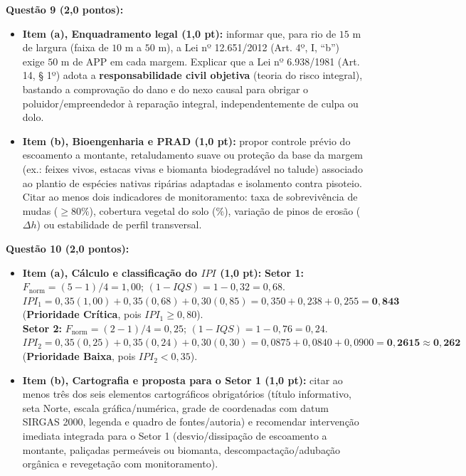 \begin{boxGabarito}
\textbf{Questão 9 (2,0 pontos):}
\begin{itemize}[leftmargin=1.4em, itemsep=2.5pt]
  \item \textbf{Item (a), Enquadramento legal (1,0 pt):} informar que, para rio de $15\text{ m}$ de largura (faixa de $10\text{ m}$ a $50\text{ m}$), a Lei nº 12.651/2012 (Art. 4º, I, ``b'') exige \textbf{$50\text{ m}$} de APP em cada margem. Explicar que a Lei nº 6.938/1981 (Art. 14, § 1º) adota a \textbf{responsabilidade civil objetiva} (teoria do risco integral), bastando a comprovação do dano e do nexo causal para obrigar o poluidor/empreendedor à reparação integral, independentemente de culpa ou dolo.
  \item \textbf{Item (b), Bioengenharia e PRAD (1,0 pt):} propor controle prévio do escoamento a montante, retaludamento suave ou proteção da base da margem (ex.: feixes vivos, estacas vivas e biomanta biodegradável no talude) associado ao plantio de espécies nativas ripárias adaptadas e isolamento contra pisoteio. Citar ao menos dois indicadores de monitoramento: taxa de sobrevivência de mudas ($\ge 80\%$), cobertura vegetal do solo ($\%$), variação de pinos de erosão ($\Delta h$) ou estabilidade de perfil transversal.
\end{itemize}

\textbf{Questão 10 (2,0 pontos):}
\begin{itemize}[leftmargin=1.4em, itemsep=2.5pt]
  \item \textbf{Item (a), Cálculo e classificação do $IPI$ (1,0 pt):}
  \textbf{Setor 1:} $F_{\text{norm}} = (5 - 1)/4 = 1{,}00$; $(1 - IQS) = 1 - 0{,}32 = 0{,}68$.
  $IPI_1 = 0{,}35(1{,}00) + 0{,}35(0{,}68) + 0{,}30(0{,}85) = 0{,}350 + 0{,}238 + 0{,}255 = \mathbf{0{,}843}$ (\textbf{Prioridade Crítica}, pois $IPI_1 \ge 0{,}80$). \\
  \textbf{Setor 2:} $F_{\text{norm}} = (2 - 1)/4 = 0{,}25$; $(1 - IQS) = 1 - 0{,}76 = 0{,}24$.
  $IPI_2 = 0{,}35(0{,}25) + 0{,}35(0{,}24) + 0{,}30(0{,}30) = 0{,}0875 + 0{,}0840 + 0{,}0900 = \mathbf{0{,}2615} \approx \mathbf{0{,}262}$ (\textbf{Prioridade Baixa}, pois $IPI_2 < 0{,}35$).
  \item \textbf{Item (b), Cartografia e proposta para o Setor 1 (1,0 pt):} citar ao menos três dos seis elementos cartográficos obrigatórios (título informativo, seta Norte, escala gráfica/numérica, grade de coordenadas com datum SIRGAS 2000, legenda e quadro de fontes/autoria) e recomendar intervenção imediata integrada para o Setor 1 (desvio/dissipação de escoamento a montante, paliçadas permeáveis ou biomanta, descompactação/adubação orgânica e revegetação com monitoramento).
\end{itemize}
\end{boxGabarito}

